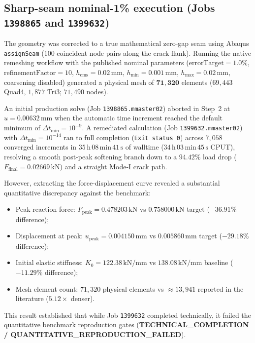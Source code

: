 \subsection{Sharp-seam nominal-1\% execution (Jobs \texttt{1398865} and \texttt{1399632})}
The geometry was corrected to a true mathematical zero-gap seam using Abaqus \texttt{assignSeam} ($100$ coincident node pairs along the crack flank). Running the native remeshing workflow with the published nominal parameters ($\text{errorTarget} = 1.0\%$, $\text{refinementFactor} = 10$, $h_{\mathrm{cms}} = 0.02\,\mathrm{mm}$, $h_{\min} = 0.001\,\mathrm{mm}$, $h_{\max} = 0.02\,\mathrm{mm}$, coarsening disabled) generated a physical mesh of $\mathbf{71{,}320}$ elements ($69{,}443$ Quad4, $1{,}877$ Tri3; $71{,}490$ nodes).

An initial production solve (Job \texttt{1398865.mmaster02}) aborted in Step~2 at $u = 0.00632\,\mathrm{mm}$ when the automatic time increment reached the default minimum of $\Delta t_{\min} = 10^{-9}$. A remediated calculation (Job \texttt{1399632.mmaster02}) with $\Delta t_{\min} = 10^{-14}$ ran to full completion (\texttt{Exit status 0}) across $7{,}058$ converged increments in $35\,\mathrm{h}\,08\,\mathrm{min}\,41\,\mathrm{s}$ of walltime ($34\,\mathrm{h}\,03\,\mathrm{min}\,45\,\mathrm{s}$ CPUT), resolving a smooth post-peak softening branch down to a $94.42\%$ load drop ($F_{\text{final}} = 0.02669\,\mathrm{kN}$) and a straight Mode-I crack path.

However, extracting the force-displacement curve revealed a substantial quantitative discrepancy against the benchmark:
\begin{itemize}
  \item Peak reaction force: $F_{\text{peak}} = 0.478203\,\mathrm{kN}$ vs $0.758000\,\mathrm{kN}$ target ($\mathbf{-36.91\%}$ difference);
  \item Displacement at peak: $u_{\text{peak}} = 0.004150\,\mathrm{mm}$ vs $0.005860\,\mathrm{mm}$ target ($\mathbf{-29.18\%}$ difference);
  \item Initial elastic stiffness: $K_0 = 122.38\,\mathrm{kN/mm}$ vs $138.08\,\mathrm{kN/mm}$ baseline ($\mathbf{-11.29\%}$ difference);
  \item Mesh element count: $71{,}320$ physical elements vs $\approx 13{,}941$ reported in the literature ($\mathbf{5.12\times}$ denser).
\end{itemize}
This result established that while Job \texttt{1399632} completed technically, it failed the quantitative benchmark reproduction gates (\textbf{TECHNICAL\_COMPLETION / QUANTITATIVE\_REPRODUCTION\_FAILED}).

